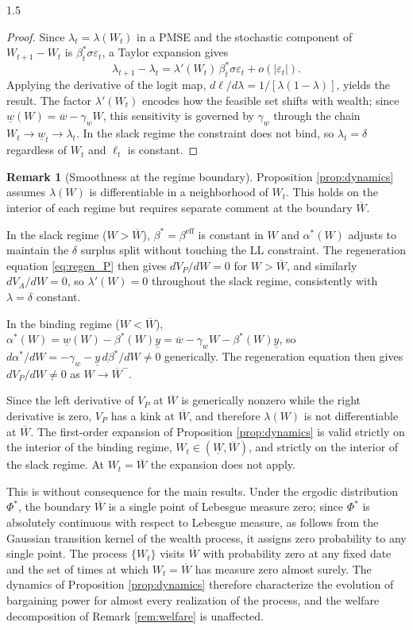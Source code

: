 \documentclass[12pt]{article}
\theoremstyle{definition}
\newtheorem{remark}{Remark}[section]
\theoremstyle{plain}
\begin{document}
\begin{spacing}{1.5}
\begin{proof}
Since $\lambda_t=\lambda(W_t)$ in a PMSE and the stochastic component of $W_{t+1}-W_t$ is $\beta_t^*\sigma\varepsilon_t$, a Taylor expansion gives
\[
\lambda_{t+1}-\lambda_t=\lambda'(W_t)\,\beta_t^*\sigma\varepsilon_t + o(|\varepsilon_t|).
\]
Applying the derivative of the logit map, $d\ell/d\lambda=1/[\lambda(1-\lambda)]$, yields the result. The factor $\lambda'(W_t)$ encodes how the feasible set shifts with wealth; since $\underline{w}(W)=\overline{w}-\gamma_w W$, this sensitivity is governed by $\gamma_w$ through the chain $W_t\to\underline{w}_t\to\lambda_t$. In the slack regime the constraint does not bind, so $\lambda_t=\delta$ regardless of $W_t$ and $\ell_t$ is constant.
\end{proof}

\begin{remark}[Smoothness at the regime boundary]\label{rem:boundary}
Proposition \ref{prop:dynamics} assumes $\lambda(W)$ is differentiable in a neighborhood of $W_t$. This holds on the interior of each regime but requires separate comment at the boundary $\overline{W}$.

In the slack regime ($W > \overline{W}$), $\beta^* = \beta^{\mathrm{eff}}$ is constant in $W$ and $\alpha^*(W)$ adjusts to maintain the $\delta$ surplus split without touching the LL constraint. The regeneration equation \eqref{eq:regen_P} then gives $dV_P/dW = 0$ for $W > \overline{W}$, and similarly $dV_A/dW = 0$, so $\lambda'(W) = 0$ throughout the slack regime, consistently with $\lambda = \delta$ constant.

In the binding regime ($W < \overline{W}$), $\alpha^*(W) = \underline{w}(W) - \beta^*(W)\underline{y} = \overline{w} - \gamma_w W - \beta^*(W)\underline{y}$, so $d\alpha^*/dW = -\gamma_w - \underline{y}\,d\beta^*/dW \neq 0$ generically. The regeneration equation then gives $dV_P/dW \neq 0$ as $W \to \overline{W}^-$.

Since the left derivative of $V_P$ at $\overline{W}$ is generically nonzero while the right derivative is zero, $V_P$ has a kink at $\overline{W}$, and therefore $\lambda(W)$ is not differentiable at $\overline{W}$. The first-order expansion of Proposition \ref{prop:dynamics} is valid strictly on the interior of the binding regime, $W_t \in (\underline{W}, \overline{W})$, and strictly on the interior of the slack regime. At $W_t = \overline{W}$ the expansion does not apply.

This is without consequence for the main results. Under the ergodic distribution $\Phi^*$, the boundary $\overline{W}$ is a single point of Lebesgue measure zero; since $\Phi^*$ is absolutely continuous with respect to Lebesgue measure, as follows from the Gaussian transition kernel of the wealth process, it assigns zero probability to any single point. The process $\{W_t\}$ visits $\overline{W}$ with probability zero at any fixed date and the set of times at which $W_t = \overline{W}$ has measure zero almost surely. The dynamics of Proposition \ref{prop:dynamics} therefore characterize the evolution of bargaining power for almost every realization of the process, and the welfare decomposition of Remark \ref{rem:welfare} is unaffected.
\end{remark}


\end{spacing}
\end{document}

